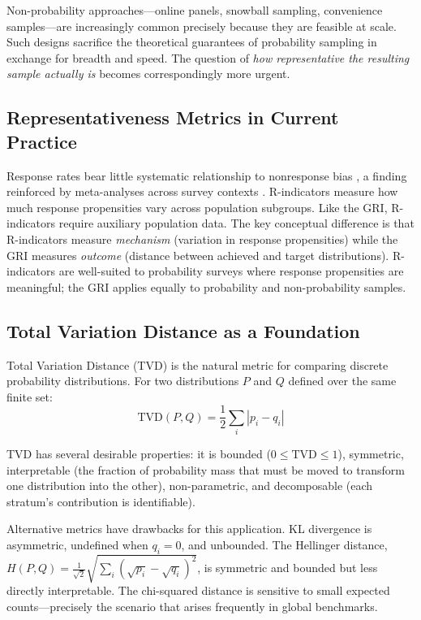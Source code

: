 \documentclass[11pt,a4paper]{article}
\begin{document}
Non-probability approaches---online panels, snowball sampling, convenience samples---are increasingly common precisely because they are feasible at scale. Such designs sacrifice the theoretical guarantees of probability sampling in exchange for breadth and speed. The question of \emph{how representative the resulting sample actually is} becomes correspondingly more urgent.

\subsection{Representativeness Metrics in Current Practice}

Response rates bear little systematic relationship to nonresponse bias \citep{groves2006nonresponse}, a finding reinforced by meta-analyses across survey contexts \citep{groves2008impact}. R-indicators \citep{schouten2009indicators} measure how much response propensities vary across population subgroups. Like the GRI, R-indicators require auxiliary population data. The key conceptual difference is that R-indicators measure \emph{mechanism} (variation in response propensities) while the GRI measures \emph{outcome} (distance between achieved and target distributions). R-indicators are well-suited to probability surveys where response propensities are meaningful; the GRI applies equally to probability and non-probability samples.

\subsection{Total Variation Distance as a Foundation}

Total Variation Distance (TVD) is the natural metric for comparing discrete probability distributions. For two distributions $P$ and $Q$ defined over the same finite set:
\begin{equation}\label{eq:tvd}
    \text{TVD}(P, Q) = \frac{1}{2} \sum_{i} |p_i - q_i|
\end{equation}

TVD has several desirable properties: it is bounded ($0 \leq \text{TVD} \leq 1$), symmetric, interpretable (the fraction of probability mass that must be moved to transform one distribution into the other), non-parametric, and decomposable (each stratum's contribution is identifiable).

Alternative metrics have drawbacks for this application. KL divergence is asymmetric, undefined when $q_i = 0$, and unbounded. The Hellinger distance, $H(P,Q) = \frac{1}{\sqrt{2}}\sqrt{\sum_i (\sqrt{p_i} - \sqrt{q_i})^2}$, is symmetric and bounded but less directly interpretable. The chi-squared distance is sensitive to small expected counts---precisely the scenario that arises frequently in global benchmarks.
\end{document}
